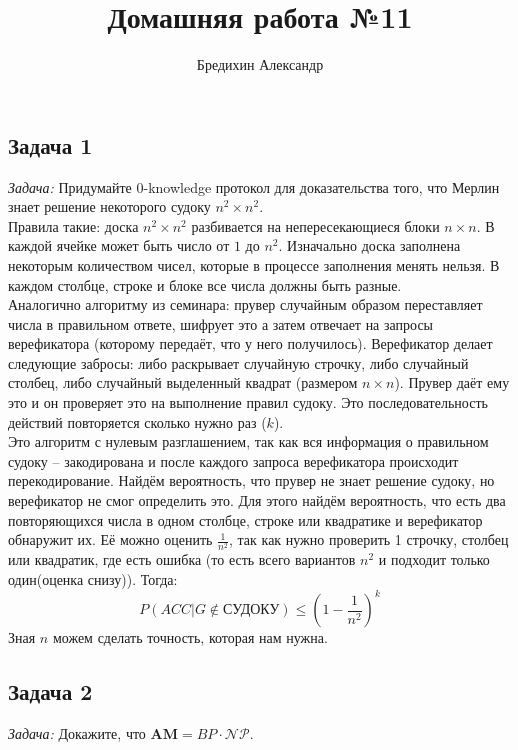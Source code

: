 \documentclass[a4paper,12pt]{article} %
\author{Бредихин Александр}
\title{Домашняя работа №11}
\begin{document}
\maketitle

\subsection*{Задача 1}
\textit{Задача:} Придумайте $0$-knowledge протокол для доказательства того, что Мерлин знает решение некоторого судоку $n^2\times n^2$. \\
Правила такие: доска $n^2\times n^2$ разбивается на непересекающиеся блоки $n\times n$. В каждой ячейке может быть число от $1$ до $n^2$. Изначально доска заполнена некоторым количеством чисел, которые в процессе заполнения менять нельзя. В каждом столбце, строке и блоке все числа должны быть разные. \\

Аналогично алгоритму из семинара: прувер случайным образом переставляет числа в правильном ответе, шифрует это а затем отвечает на запросы верефикатора (которому передаёт, что у него получилось). Верефикатор делает следующие забросы: либо раскрывает случайную строчку, либо случайный столбец, либо случайный выделенный квадрат (размером $n\times n$). Прувер даёт ему это и он проверяет это на выполнение правил судоку. Это последовательность действий повторяется сколько нужно раз ($ k $).\\

Это алгоритм с нулевым разглашением, так как вся информация о правильном судоку -- закодирована и после каждого запроса верефикатора происходит перекодирование. Найдём вероятность, что прувер не знает решение судоку, но верефикатор не смог определить это. Для этого найдём вероятность, что есть два повторяющихся числа в одном столбце, строке или квадратике и верефикатор обнаружит их. Её можно оценить $ \frac{1}{n^2} $, так как нужно проверить 1 строчку, столбец или квадратик, где есть ошибка (то есть всего вариантов $ n^2 $ и подходит только один(оценка снизу)). Тогда:
$$
P(ACC | G \notin \text{СУДОКУ}) \leq \left( 1 - \frac{1}{n^2} \right)^k
$$
Зная $ n $ можем сделать точность, которая нам нужна.


\subsection*{Задача 2}
\textit{Задача:} Докажите, что $\mathbf{AM} = BP\cdot \mathcal{NP}$. \\
\end{document}
